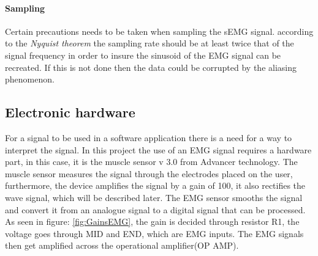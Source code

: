 \paragraph{Sampling}
Certain precautions needs to be taken when sampling the sEMG signal. according to the \textit{Nyquist theorem} the sampling rate should be at least twice that of the signal frequency in order to insure the sinusoid of the EMG signal can be recreated. If this is not done then the data could be corrupted by the aliasing phenomenon. \cite{Nyquist}




\subsection*{Electronic hardware} \label{sec:elHW}
For a signal to be used in a software application there is a need for a way to interpret the signal. In this project the use of an EMG signal requires a hardware part, in this case, it is the muscle sensor v 3.0 from Advancer technology. The muscle sensor measures the signal through the electrodes placed on the user, furthermore, the device amplifies the signal by a gain of 100, it also rectifies the wave signal, which will be described later. The EMG sensor smooths the signal and convert it from an analogue signal to a digital signal that can be processed\cite{EMGHARD}.\\
As seen in figure: \ref{fig:GainsEMG}, the gain is decided through resistor R1, the voltage goes through MID and END, which are EMG inputs. The EMG signals then get amplified across the operational amplifier(OP AMP).\\

